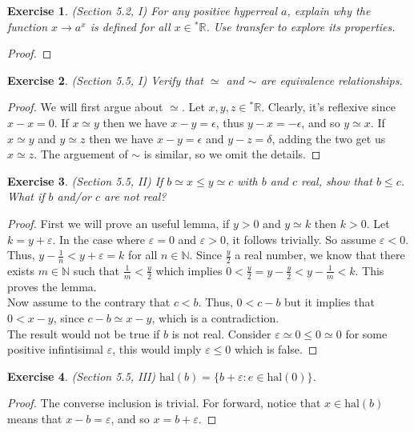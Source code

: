 \documentclass[a4paper, 11pt, openany]{book}
\theoremstyle{plain}
\newtheorem{exercise}{Exercise}[chapter]
\theoremstyle{plain}
\newcommand{\N}{\mathbb{N}}
\newcommand{\R}{\mathbb{R}}
\newcommand{\ep}{\varepsilon}
\newcommand{\hyp}{{}^*}
\newcommand{\hal}{\text{hal}}
\begin{document}
  \begin{exercise}
    (Section  5.2, I)
    For any positive hyperreal $a$, explain why the function $x \rightarrow a^x$ is defined for all $x \in \hyp \R$. Use transfer to explore its properties.
  \end{exercise}
  \begin{proof}
    
  \end{proof}

  \begin{exercise}
    (Section 5.5, I)
    Verify that $\simeq$ and $\sim$ are equivalence relationships.
  \end{exercise}
  \begin{proof}
    We will first argue about $\simeq$. Let $x,y,z \in \hyp \R$. Clearly, it's reflexive since $x-x=0$. If $x \simeq y$ then we have $x-y= \epsilon$, thus $y-x=-\epsilon$, and so $y \simeq x$. If $x \simeq y$ and $y \simeq z$ then we have $x-y=\epsilon$ and $y-z=\delta$, adding the two get us $x \simeq z$. The arguement of $\sim$ is similar, so we omit the details.
  \end{proof}

  \begin{exercise}
    (Section 5.5, II)
    If $b \simeq x \leq y \simeq c$ with $b$ and $c$ real, show that $b \leq c$. What if $b$ and/or $c$ are not real?
  \end{exercise}
  \begin{proof}
    First we will prove an useful lemma, if $y>0$ and $y \simeq k$ then $k>0$. Let $k=y+\ep$. In the case where $\ep=0$ and $\ep>0$, it follows trivially. So assume $\ep<0$. Thus, $y-\frac{1}{n}<y+\ep=k$ for all $n \in \N$. Since $\frac{y}{2}$ a real number, we know that there exists $m \in \N$ such that $\frac{1}{m}<\frac{y}{2}$ which implies $0<\frac{y}{2}=y-\frac{y}{2}<y-\frac{1}{m}<k$. This proves the lemma. \\
    Now assume to the contrary that $c<b$. Thus, $0<c-b$ but it implies that $0<x-y$, since $c-b \simeq x-y$, which is a contradiction.\\
    The result would not be true if $b$ is not real. Consider $\ep \simeq 0 \leq 0 \simeq 0$ for some positive infintisimal $\ep$, this would imply $\ep \leq 0$ which is false. 
  \end{proof}

  \begin{exercise}
    (Section 5.5, III)
    $\hal(b)=\{b+\ep: e \in \hal (0)\}$.
  \end{exercise}
  \begin{proof}
    The converse inclusion is trivial. For forward, notice that $x \in \hal (b)$ means that $x-b=\ep$, and so $x=b+\ep$.
  \end{proof}
\end{document}
